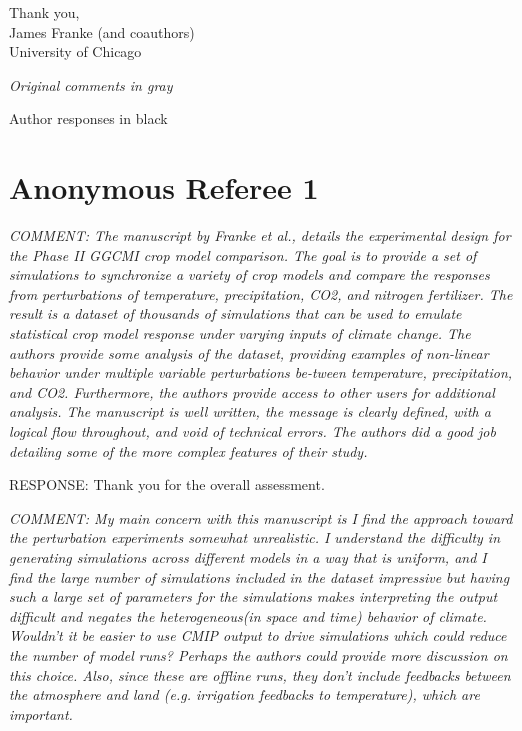 \documentclass[gmd, manuscript]{copernicus} %
\begin{document}
\bigskip

\begin{flushright}
\noindent Thank you,\\
James Franke (and coauthors)\\
University of Chicago\\
\end{flushright}

\bigskip
\bigskip

\noindent \textcolor{dark-gray}{\textit{Original comments in gray}}

\smallskip

\noindent Author responses in black


\clearpage
\section{Anonymous Referee 1}

\textcolor{dark-gray}{\textit{COMMENT: The manuscript by Franke et al., details the experimental design for the Phase II GGCMI crop model comparison. The goal is to provide a set of simulations to synchronize a variety of crop models and compare the responses from perturbations of temperature, precipitation, CO2, and nitrogen fertilizer. The result is a dataset of thousands of simulations that can be used to emulate statistical crop model response under varying inputs of climate change. The authors provide some analysis of the dataset, providing examples of non-linear behavior under multiple variable perturbations be-tween temperature, precipitation, and CO2. Furthermore, the authors provide access to other users for additional analysis. The manuscript is well written, the message is clearly defined, with a logical flow throughout, and void of technical errors. The authors did a good job detailing some of the more complex features of their study.}} 

RESPONSE: Thank you for the overall assessment.
\smallskip

\textcolor{dark-gray}{\textit{COMMENT: My main concern with this manuscript is I find the approach toward the perturbation experiments somewhat unrealistic. I understand the difficulty in generating simulations across different models in a way that is uniform, and I find the large number of simulations included in the dataset impressive but having such a large set of parameters for the simulations makes interpreting the output difficult and negates the heterogeneous(in space and time) behavior of climate. Wouldn’t it be easier to use CMIP output to drive simulations which could reduce the number of model runs? Perhaps the authors could provide more discussion on this choice. Also, since these are offline runs, they don’t include feedbacks between the atmosphere and land (e.g. irrigation feedbacks to temperature), which are important.}}
\end{document}
